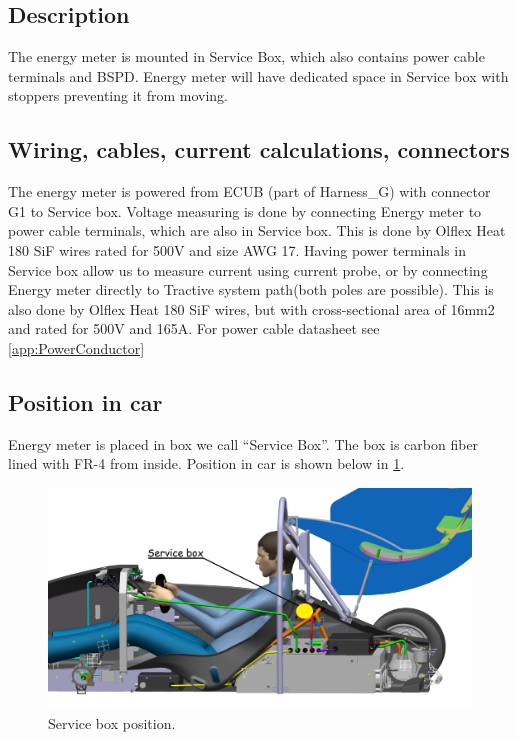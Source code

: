 \subsection{Description}

The energy meter is mounted in Service Box, which also contains power cable terminals and BSPD. Energy meter will have dedicated space in Service box with stoppers preventing it from moving. 

\subsection{Wiring, cables, current calculations, connectors}

The energy meter is powered from ECUB (part of Harness\_G) with connector G1 to Service box. Voltage measuring is done by connecting Energy meter to power cable terminals, which are also in Service box. This is done by Olflex Heat 180 SiF wires rated for 500V and size AWG 17. Having power terminals in Service box allow us to measure current using current probe, or by connecting Energy meter directly to Tractive system path(both poles are possible). This is also done by Olflex Heat 180 SiF wires, but with cross-sectional area of 16mm2 and rated for 500V and 165A. For power cable datasheet see \ref{app:PowerConductor}

\subsection{Position in car}

Energy meter is placed in box we call “Service Box”. The box is carbon fiber lined with FR-4 from inside. Position in car is shown below in \ref{fig:ServiceBox-position}.

\begin{figure}[H]
	\centering
	\includegraphics[width=\textwidth]{./img/ServiceBox-position.jpg}
	\caption{Service box position.}
	\label{fig:ServiceBox-position}
\end{figure}





